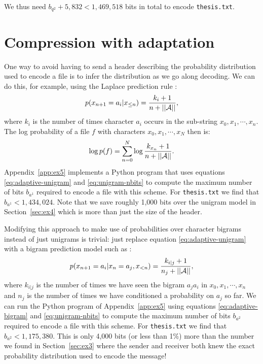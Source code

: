 \documentclass[10pt,a4paper,oneside,onecolumn]{article}
\newcommand*{\thesisTXT}{{\tt thesis.txt}\xspace}
\newcommand*{\norm}[1]{\ensuremath{\left|\left|#1\right|\right|}}
\newcommand*{\textapprox}{\raisebox{0.5ex}{\texttildelow}}
\begin{document}
We thus need $b_{q^2} + 5,832 < 1,469,518$ bits in total to encode \thesisTXT.

\section{Compression with adaptation}\label{sec:ex5}

One way to avoid having to send a header describing the probability distribution
used to encode a file is to infer the distribution as we go along decoding. We
can do this, for example, using the Laplace prediction rule
\cite[p.~2]{it-assign}:
\begin{equation}
    p(x_{n+1}=a_i|x_{\le n}) = {k_i + 1 \over n + \norm{\mathcal{A}}},
\end{equation}
where $k_i$ is the number of times character $a_i$ occurs in the sub-string
$x_0, x_1, \cdots, x_n$.
The log probability of a file $f$ with characters $x_0, x_1, \cdots, x_N$ then
is:
\begin{equation}\label{eq:adaptive-unigram}
    \log p(f) =
    \sum\limits_{n = 0}^N \log {k_{x_n} + 1 \over n + \norm{\mathcal{A}}}.
\end{equation}
Appendix~\ref{app:ex5} implements a Python program that uses equations
\eqref{eq:adaptive-unigram} and \eqref{eq:unigram-nbits} to compute the maximum
number of bits $b_{a^1}$ required to encode a file with this scheme. For
\thesisTXT we find that $b_{a^1} < 1,434,024$. Note that we save roughly 1,000
bits over the unigram model in Section~\ref{sec:ex4} which is more than just the
size of the header.

Modifying this approach to make use of probabilities over character bigrams
instead of just unigrams is trivial: just replace equation
\eqref{eq:adaptive-unigram} with a bigram prediction model such as
\cite[p.~3]{it-assign}:
\begin{equation}\label{eq:adaptive-bigram}
    p(x_{n+1}=a_i|x_{n} = a_j, x_{<n})
    = {k_{i|j} + 1 \over n_j + \norm{\mathcal{A}}},
\end{equation}
where $k_{i|j}$ is the number of times we have seen the bigram $a_ja_i$ in
$x_0, x_1, \cdots, x_n$ and $n_j$ is the number of times we have conditioned a
probability on $a_j$ so far.
We can run the Python program of Appendix~\ref{app:ex5} using equations
\eqref{eq:adaptive-bigram} and \eqref{eq:unigram-nbits} to compute the maximum
number of bits $b_{a^2}$ required to encode a file with this scheme. For
\thesisTXT we find that $b_{a^2} < 1,175,380$. This is only \textapprox 4,000
bits (or less than 1\%) more than the number we found in Section~\ref{sec:ex3}
where the sender and receiver both knew the exact probability distribution used
to encode the message!
\end{document}
